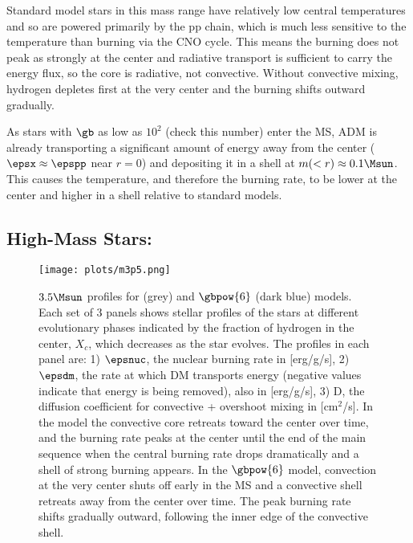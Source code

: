 Standard model stars in this mass range have relatively low central temperatures and so are powered primarily by the pp chain, which is much less sensitive to the temperature than burning via the CNO cycle. This means the burning does not peak as strongly at the center and radiative transport is sufficient to carry the energy flux, so the core is radiative, not convective. Without convective mixing, hydrogen depletes first at the very center and the burning shifts outward gradually.

As stars with $\gb$ as low as $10^2$ (check this number) enter the MS, ADM is already transporting a significant amount of energy away from the center ($\epsx \approx \epspp$ near $r=0$) and depositing it in a shell at $m(<r) \approx 0.1 \Msun$. This causes the temperature, and therefore the burning rate, to be lower at the center and higher in a shell relative to standard models.


\subsection{High-Mass Stars: \mrangehigh}
\label{sub:highmass}

  \begin{figure}
    \centering
    \texttt{[image: plots/m3p5.png]}
    \caption{$3.5 \Msun$ profiles for \nodm (grey) and $\gbpow{6}$ (dark blue) models. Each set of 3 panels shows stellar profiles of the stars at different evolutionary phases indicated by the fraction of hydrogen in the center, $X_c$, which decreases as the star evolves. The profiles in each panel are: 1) $\epsnuc$, the nuclear burning rate in [erg/g/s], 2) $\epsdm$, the rate at which DM transports energy (negative values indicate that energy is being removed), also in [erg/g/s], 3) D, the diffusion coefficient for convective + overshoot mixing in [cm$^2$/s]. In the \nodm model the convective core retreats toward the center over time, and the burning rate peaks at the center until the end of the main sequence when the central burning rate drops dramatically and a shell of strong burning appears. In the $\gbpow{6}$ model, convection at the very center shuts off early in the MS and a convective shell retreats away from the center over time. The peak burning rate shifts gradually outward, following the inner edge of the convective shell.
    }
    \label{fig:m3p5}
  \end{figure}

